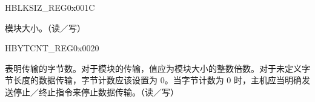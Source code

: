 \begin{register}{H}{BLKSIZ\_REG}{0x001C}\label{regdesc:BLKSIZREG}
%
%
\regnewline%
\begin{regdesc}\begin{reglist}
\item [BLOCK\_SIZE]模块大小。（读／写）
\end{reglist}\end{regdesc}
\end{register}


\begin{register}{H}{BYTCNT\_REG}{0x0020}\label{regdesc:BYTCNTREG}
%
\regnewline%
\begin{regdesc}\begin{reglist}
\item [BYTCNT\_REG]表明传输的字节数。对于模块的传输，值应为模块大小的整数倍数。对于未定义字节长度的数据传输，字节计数应该设置为 0。当字节计数为 0 时，主机应当明确发送停止／终止指令来停止数据传输。（读／写）
\end{reglist}\end{regdesc}
\end{register}


